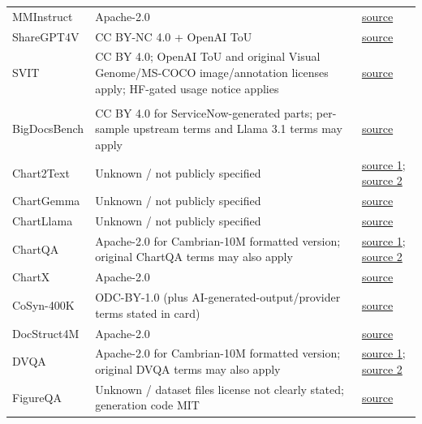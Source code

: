 \begin{longtable}{@{}>{\raggedright\arraybackslash}p{}>{\raggedright\arraybackslash}p{}>{\raggedright\arraybackslash}p{}@{}}
MMInstruct & Apache-2.0 & \href{https://huggingface.co/datasets/yuecao0119/MMInstruct-GPT4V}{source} \\
ShareGPT4V & CC BY-NC 4.0 + OpenAI ToU & \href{https://huggingface.co/datasets/Lin-Chen/ShareGPT4V}{source} \\
SVIT & CC BY 4.0; OpenAI ToU and original Visual Genome/MS-COCO image/annotation licenses apply; HF-gated usage notice applies & \href{https://huggingface.co/datasets/BAAI/SVIT}{source} \\
\midrule
\rowcolor{instructcolor}\multicolumn{3}{l}{\textit{Chart \& Table}} \\
BigDocsBench & CC BY 4.0 for ServiceNow-generated parts; per-sample upstream terms and Llama 3.1 terms may apply & \href{https://huggingface.co/datasets/ServiceNow/BigDocs-Bench}{source} \\
Chart2Text & Unknown / not publicly specified & \href{https://github.com/JasonObeid/Chart2Text}{source 1}; \href{https://github.com/JasonObeid/Chart2TextImages}{source 2} \\
ChartGemma & Unknown / not publicly specified & \href{https://huggingface.co/datasets/ahmed-masry/ChartGemma}{source} \\
ChartLlama & Unknown / not publicly specified & \href{https://huggingface.co/datasets/listen2you002/ChartLlama-Dataset}{source} \\
ChartQA & Apache-2.0 for Cambrian-10M formatted version; original ChartQA terms may also apply & \href{https://huggingface.co/datasets/nyu-visionx/Cambrian-10M/resolve/main/chartqa.tar.gz}{source 1}; \href{https://huggingface.co/datasets/nyu-visionx/Cambrian-10M/resolve/main/jsons/Cambrian10M.jsonl}{source 2} \\
ChartX & Apache-2.0 & \href{https://huggingface.co/datasets/U4R/ChartX}{source} \\
CoSyn-400K & ODC-BY-1.0 (plus AI-generated-output/provider terms stated in card) & \href{https://huggingface.co/datasets/allenai/CoSyn-400K}{source} \\
DocStruct4M & Apache-2.0 & \href{https://huggingface.co/datasets/mPLUG/DocStruct4M}{source} \\
DVQA & Apache-2.0 for Cambrian-10M formatted version; original DVQA terms may also apply & \href{https://huggingface.co/datasets/nyu-visionx/Cambrian-10M/resolve/main/dvqa.tar.gz}{source 1}; \href{https://huggingface.co/datasets/nyu-visionx/Cambrian-10M/resolve/main/jsons/Cambrian10M.jsonl}{source 2} \\
FigureQA & Unknown / dataset files license not clearly stated; generation code MIT & \href{https://download.microsoft.com/download/c/3/1/c315c9d8-8239-487e-a895-2d3ff805b508/figureqa-train1-v1.tar.gz}{source} \\

\end{longtable}
